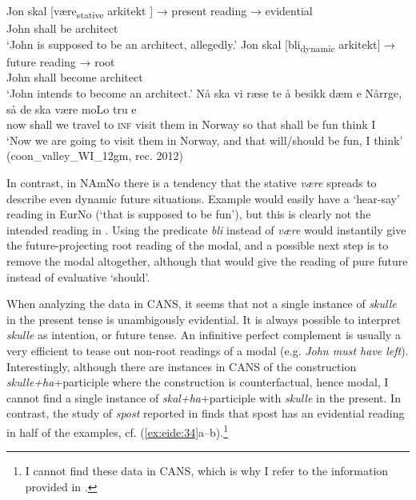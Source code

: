 \documentclass[output=paper]{langscibook}
\begin{document}
\ea%
    \label{ex:eide:33}
    \ea\label{ex:eide:33a}
    \gll Jon skal [være\textsubscript{stative} arkitekt ] → present reading → evidential \\
         John shall be architect\\
    \glt ‘John is supposed to be an architect, allegedly.’
    \ex\label{ex:eide:33b}
    \gll Jon skal [bli\textsubscript{dynamic} arkitekt] → future reading → root\\
         John shall become architect\\
    \glt ‘John intends to become an architect.’
    \ex \label{ex:eide:33c} 
    \gll Nå ska vi ræse te å besikk dæm e Nårrge, så de ska være moLo tru e\\
         now shall we travel to \textsc{inf} visit them in Norway so that shall be fun think I\\
    \glt ‘Now we are going to visit them in Norway, and that will/should be fun, I think’ ({{coon\_valley\_WI\_12gm}}, rec. 2012)\\
    \z %
\z


In contrast, in NAmNo there is a tendency that the stative \textit{være} spreads to describe even dynamic future situations. Example  would easily have a ‘hear-say’ reading in EurNo (‘that is supposed to be fun’), but this is clearly not the intended reading in . Using the predicate \textit{bli} instead of \textit{være} would instantily give the future-projecting root reading of the modal, and a possible next step is to remove the modal altogether, although that would give the reading of pure future instead of evaluative ‘should’. 

When analyzing the data in CANS, it seems that not a single instance of \textit{skulle} in the present tense is unambigously evidential. It is always possible to interpret \textit{skulle} as intention, or future tense. An infinitive perfect complement is usually a very efficient to tease out non-root readings of a modal (e.g. \textit{John must have left}). Interestingly, although there are instances in CANS of the construction \textit{skulle+ha}+participle where the construction is counterfactual, hence modal, I cannot find a single instance of \textit{skal+ha}+participle with \textit{skulle} in the present. In contrast, the study of \textit{spost} reported in \citet{EideHjelde2015Borrowing} finds that spost has an evidential reading in half of the examples, cf. (\ref{ex:eide:34}a--b).\footnote{I cannot find these data in CANS, which is why I refer to the information provided in \citet{EideHjelde2015Borrowing}.} 
\end{document}

